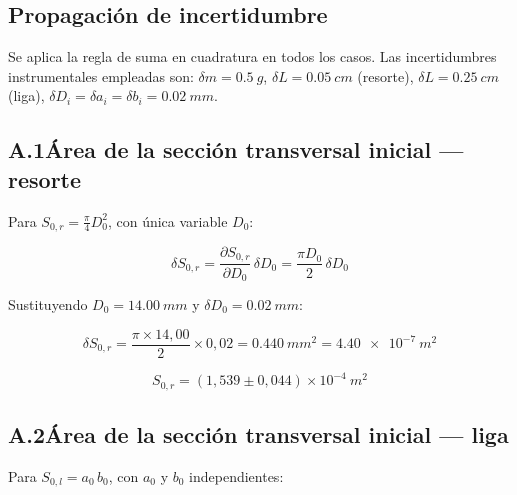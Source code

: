 
\begin{appendices}

\section{Propagación de incertidumbre}

Se aplica la regla de suma en cuadratura en todos los casos.
Las incertidumbres instrumentales empleadas son:
$\delta m = \qty{0,5}{g}$,
$\delta L = \qty{0,05}{cm}$ (resorte),
$\delta L = \qty{0,25}{cm}$ (liga),
$\delta D_i = \delta a_i = \delta b_i = \qty{0,02}{mm}$.

\subsection*{A.1\quad Área de la sección transversal inicial — resorte}

Para $S_{0,r} = \tfrac{\pi}{4}D_0^2$, con única variable $D_0$:

\begin{equation}
    \delta S_{0,r}
    = \frac{\partial S_{0,r}}{\partial D_0}\,\delta D_0
    = \frac{\pi D_0}{2}\,\delta D_0
    \label{eq:inc_S0r}
\end{equation}

Sustituyendo $D_0 = \qty{14,00}{mm}$ y $\delta D_0 = \qty{0,02}{mm}$:

\[
    \delta S_{0,r}
    = \frac{\pi \times 14{,}00}{2} \times 0{,}02
    = \qty{0,440}{mm^2}
    = \qty{4,40e-7}{m^2}
\]

\[
    \boxed{S_{0,r} = (1{,}539 \pm 0{,}044)\times10^{-4}\ \unit{m^2}}
\]

\subsection*{A.2\quad Área de la sección transversal inicial — liga}

Para $S_{0,l} = a_0\,b_0$, con $a_0$ y $b_0$ independientes:


\end{appendices}
